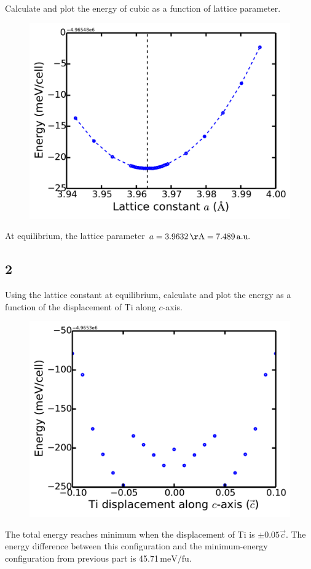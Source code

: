 \documentclass[12pt]{article}
\newcommand{\unit}[1]{\ensuremath{\, \mathrm{#1}}}
\begin{document}
Calculate and plot the energy of cubic  as a function of lattice parameter. 

\begin{figure}[h]
\begin{center}
	\includegraphics[width=.6\textwidth]{pto_latt}
\end{center}
\end{figure}

At equilibrium, the lattice parameter $a = 3.9632\unit{\AA} = 7.489\unit{a.u.}$

\subsection*{2}

Using the lattice constant at equilibrium, calculate and plot the energy as a function of the displacement of Ti along $c$-axis. 

\begin{figure}[h]
\begin{center}
	\includegraphics[width=.6\textwidth]{pto_disp}
\end{center}
\end{figure}

The total energy reaches minimum when the displacement of Ti is $\pm0.05\vec{c}$. The energy difference between this configuration and the minimum-energy configuration from previous part is 45.71\unit{meV/fu}. 
\end{document}

